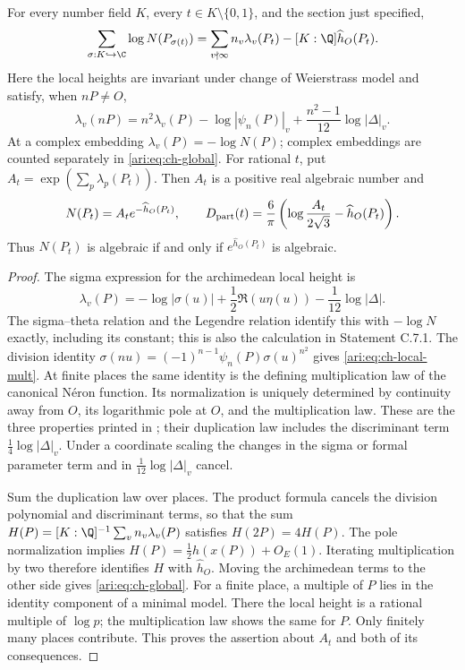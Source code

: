 \begin{proposition}\label{ari:C.6.1}
For every number field $K$, every $t\in K\setminus\{0,1\}$,
and the section just specified,
\begin{equation}\label{ari:eq:ch-global}
 \sum_{\sigma:K\hookrightarrow\C}\log N(P_{\sigma(t)})
 =\sum_{v\nmid\infty}n_v\lambda_v(P_t)
          -[K:\Q]\widehat h_O(P_t).
\end{equation}
Here the local heights are invariant under change of Weierstrass
model and satisfy, when $nP\ne O$,
\begin{equation}\label{ari:eq:ch-local-mult}
 \lambda_v(nP)=n^2\lambda_v(P)-\log|\psi_n(P)|_v
                   +\frac{n^2-1}{12}\log|\Delta|_v.
\end{equation}
At a complex embedding $\lambda_v(P)=-\log N(P)$; complex
embeddings are counted separately in \eqref{ari:eq:ch-global}.
For rational $t$, put $A_t=\exp(\sum_p\lambda_p(P_t))$.
Then $A_t$ is a positive real algebraic number and
\[
 N(P_t)=A_t e^{-\widehat h_O(P_t)},\qquad
 D_{\rm part}(t)=\frac6\pi
       \left(\log\frac{A_t}{2\sqrt3}-\widehat h_O(P_t)\right).
\]
Thus $N(P_t)$ is algebraic if and only if
$e^{\widehat h_O(P_t)}$ is algebraic.
\end{proposition}
\begin{proof}
The sigma expression for the archimedean local height is
\[
 \lambda_v(P)=-\log|\sigma(u)|
       +\frac12\Re(u\eta(u))-\frac1{12}\log|\Delta|.
\]
The sigma--theta relation and the Legendre relation identify this
with $-\log N$ exactly, including its constant; this is also the
calculation in Statement C.7.1. The division identity
$\sigma(nu)=(-1)^{n-1}\psi_n(P)\sigma(u)^{n^2}$ gives
\eqref{ari:eq:ch-local-mult}. At finite places the same identity is
the defining multiplication law of the canonical N\'eron function.
Its normalization is uniquely determined by continuity away from
$O$, its logarithmic pole at $O$, and the multiplication law.
These are the three properties printed in
\citet[Section 2.1]{demarco2017}; their duplication law includes
the discriminant term $\frac14\log|\Delta|_v$.
Under a coordinate scaling the changes in the sigma or formal
parameter term and in $\frac1{12}\log|\Delta|_v$ cancel.

Sum the duplication law over places. The product formula cancels
the division polynomial and discriminant terms, so that the sum
$H(P)=[K:\Q]^{-1}\sum_vn_v\lambda_v(P)$ satisfies
$H(2P)=4H(P)$. The pole normalization implies
$H(P)=\frac12h(x(P))+O_E(1)$. Iterating multiplication by two
therefore identifies $H$ with $\widehat h_O$. Moving the
archimedean terms to the other side gives \eqref{ari:eq:ch-global}.
For a finite place, a multiple of $P$ lies in the identity component
of a minimal model. There the local height is a rational multiple
of $\log p$; the multiplication law shows the same for $P$.
Only finitely many places contribute. This proves the assertion
about $A_t$ and both of its consequences.
\end{proof}

